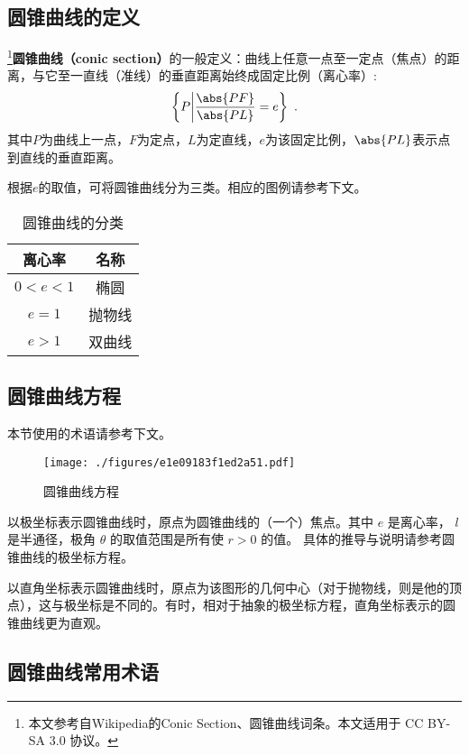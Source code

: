 
\begin{issues}
\issueDraft
\end{issues}

\subsection{圆锥曲线的定义}
\footnote{本文参考自Wikipedia的Conic Section、圆锥曲线词条。本文适用于 CC BY-SA 3.0 协议。}\textbf{圆锥曲线（conic section）}的一般定义：曲线上任意一点至一定点（焦点）的距离，与它至一直线（准线）的垂直距离始终成固定比例（离心率）:
\begin{equation}
\left \{P \middle| \frac{\abs{PF}}{\abs{PL}}=e \right \}~.
\end{equation}
其中$P$为曲线上一点，$F$为定点，$L$为定直线，$e$为该固定比例，$\abs{PL}$表示点到直线的垂直距离。

根据$e$的取值，可将圆锥曲线分为三类。相应的图例请参考下文。
\begin{table}[ht]
\centering
\caption{圆锥曲线的分类}\label{tab_conic_2}
\begin{tabular}{|c|c|}
\hline
离心率 & 名称\\
\hline
$0<e<1$ & 椭圆\\
\hline
$e=1$ & 抛物线\\
\hline
$e>1$ & 双曲线\\
\hline
\end{tabular}
\end{table}

\subsection{圆锥曲线方程}
本节使用的术语请参考下文。
\begin{figure}[ht]
\centering
\texttt{[image: ./figures/e1e09183f1ed2a51.pdf]}
\caption{圆锥曲线方程} \label{fig_conic_1}
\end{figure}

以极坐标表示圆锥曲线时，原点为圆锥曲线的（一个）焦点。其中 $e$ 是离心率， $l$ 是半通径，极角 $\theta$ 的取值范围是所有使 $r>0$ 的值。 
具体的推导与说明请参考圆锥曲线的极坐标方程。

以直角坐标表示圆锥曲线时，原点为该图形的几何中心（对于抛物线，则是他的顶点），这与极坐标是不同的。有时，相对于抽象的极坐标方程，直角坐标表示的圆锥曲线更为直观。

\subsection{圆锥曲线常用术语}

